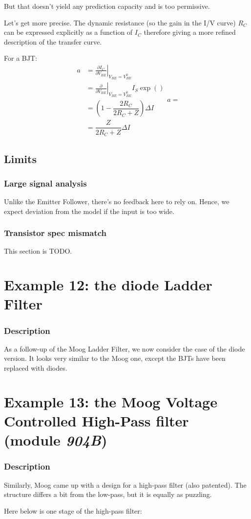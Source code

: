 \documentclass[10pt]{article}
\begin{document}
But that doesn't yield any prediction capacity and is too permissive.


Let's get more precise. The dynamic resistance (so the gain in the I/V curve) $R_C$ can be expressed explicitly as a function of $I_C$ therefore giving a more refined description of the transfer curve.

For a BJT:
\begin{equation}
\begin{split}
	a	& = \left. \frac{\partial I_C}{\partial V_{BE}} \right|_{V_{BE} = V_{BE}^0}\\
 		& = \left. \frac{\partial }{\partial V_{BE}} \right|_{V_{BE} = V_{BE}^0} I_S \exp \left( \right)\\
		& = \left( 1 - \dfrac{2R_C}{2R_C + Z} \right) \Delta I\\
		& = \dfrac{Z}{2R_C + Z} \Delta I
\end{split}
	a = 
\end{equation}

 
\subsection*{Limits}


\subsubsection*{Large signal analysis}
Unlike the Emitter Follower, there's no feedback here to rely on. Hence, we expect deviation from the model if the input is too wide.

\subsubsection*{Transistor spec mismatch}
This section is TODO.



\section*{Example 12: the diode Ladder Filter}

\subsubsection*{Description}
As a follow-up of the Moog Ladder Filter, we now consider the case of the diode version. It looks very similar to the Moog one, except the BJTs have been replaced with diodes. 



\section*{Example 13: the Moog Voltage Controlled High-Pass filter (module \textit{904B})}

\subsubsection*{Description}
Similarly, Moog came up with a design for a high-pass filter (also patented). The structure differs a bit from the low-pass, but it is equally as puzzling.

Here below is one stage of the high-pass filter:
\end{document}
